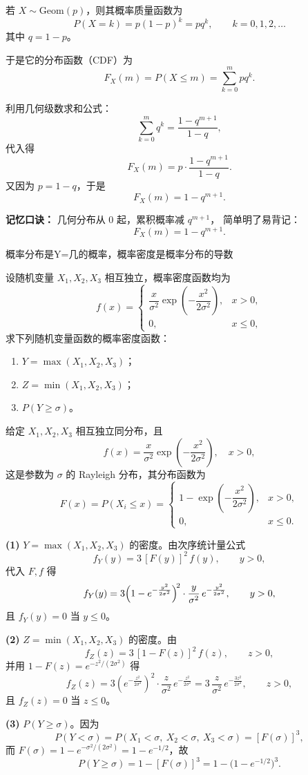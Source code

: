 \begin{dxtips}
    若 \( X \sim \mathrm{Geom}(p) \)，则其概率质量函数为
\[
P(X=k)=p(1-p)^k=pq^k,\qquad k=0,1,2,\ldots
\]
其中 \( q=1-p \)。

于是它的分布函数（CDF）为
\[
F_X(m)=P(X\le m)=\sum_{k=0}^{m} p q^k.
\]

利用几何级数求和公式：
\[
\sum_{k=0}^{m} q^k=\frac{1-q^{m+1}}{1-q},
\]
代入得
\[
F_X(m)=p\cdot\frac{1-q^{m+1}}{1-q}.
\]
又因为 \(p=1-q\)，于是
\[
\boxed{F_X(m)=1-q^{m+1}}.
\]

\textbf{记忆口诀：} 几何分布从 0 起，累积概率减 \(q^{m+1}\)，
简单明了易背记：
\[
F_X(m)=1-q^{m+1}.
\]
\end{dxtips}
\begin{dxtips}
    概率分布是Y=几的概率，概率密度是概率分布的导数
\end{dxtips}
\begin{homework}[60]
设随机变量 $X_1, X_2, X_3$ 相互独立，概率密度函数均为
\[
f(x)=
\begin{cases}
\dfrac{x}{\sigma^2}\exp\!\left(-\dfrac{x^2}{2\sigma^2}\right), & x>0,\\[6pt]
0, & x\le 0,
\end{cases}
\]
求下列随机变量函数的概率密度函数：
\begin{enumerate}[(1)]
  \item $Y=\max(X_1,X_2,X_3)$；
  \item $Z=\min(X_1,X_2,X_3)$；
  \item $P(Y\ge\sigma)$。
\end{enumerate}
\end{homework}
\begin{solution}
给定 $X_1,X_2,X_3$ 相互独立同分布，且
\[
f(x)=\frac{x}{\sigma^2}\exp\!\left(-\frac{x^2}{2\sigma^2}\right),\quad x>0,
\]
这是参数为 $\sigma$ 的 Rayleigh 分布，其分布函数为
\[
F(x)=P(X_i\le x)=
\begin{cases}
1-\exp\!\left(-\dfrac{x^2}{2\sigma^2}\right), & x>0,\\[6pt]
0,& x\le0.
\end{cases}
\]

\medskip
\noindent\textbf{(1) }$Y=\max(X_1,X_2,X_3)$ 的密度。由次序统计量公式
\[
f_Y(y)=3\,[F(y)]^{2}\,f(y),\qquad y>0,
\]
代入 $F,f$ 得
\[
f_Y(y)=3\Bigl(1-e^{-\frac{y^2}{2\sigma^2}}\Bigr)^{\!2}
\cdot \frac{y}{\sigma^2}\,e^{-\frac{y^2}{2\sigma^2}},\qquad y>0,
\]
且 $f_Y(y)=0$ 当 $y\le0$。

\medskip
\noindent\textbf{(2) }$Z=\min(X_1,X_2,X_3)$ 的密度。由
\[
f_Z(z)=3\,[1-F(z)]^{2}\,f(z),\qquad z>0,
\]
并用 $1-F(z)=e^{-z^2/(2\sigma^2)}$ 得
\[
f_Z(z)=3\left(e^{-\frac{z^2}{2\sigma^2}}\right)^{\!2}
\cdot \frac{z}{\sigma^2}\,e^{-\frac{z^2}{2\sigma^2}}
=3\,\frac{z}{\sigma^2}\,e^{-\frac{3z^2}{2\sigma^2}},\qquad z>0,
\]
且 $f_Z(z)=0$ 当 $z\le0$。

\medskip
\noindent\textbf{(3) }$P(Y\ge \sigma)$。因为
\[
P(Y<\sigma)=P(X_1<\sigma,\ X_2<\sigma,\ X_3<\sigma)=[F(\sigma)]^3,
\]
而 $F(\sigma)=1-e^{-\sigma^2/(2\sigma^2)}=1-e^{-1/2}$，故
\[
P(Y\ge \sigma)=1-[F(\sigma)]^3
=1-\bigl(1-e^{-1/2}\bigr)^{3}.
\]
\end{solution}
